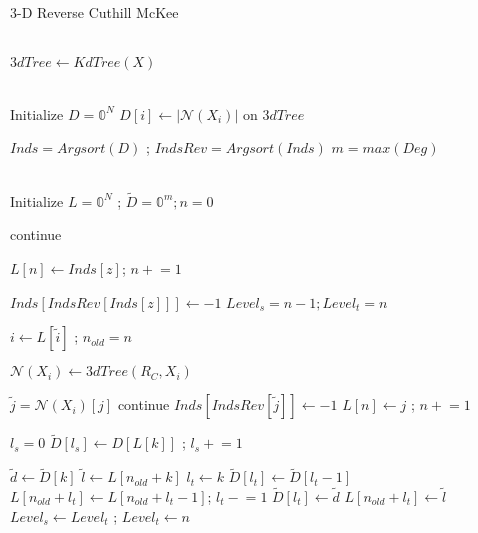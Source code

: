 \documentclass[a4paper]{article}
\begin{document}
\begin{algorithm}
\caption{3-D Reverse Cuthill McKee}\label{alg:3DRCM}
\begin{algorithmic}[1]
\\
\State $3dTree \gets KdTree(X)$ 


\\
\State Initialize $D = \mathbb{0}^{N}$
    \State $D[i] \gets |\mathcal{N}(X_i)|$ on $3dTree$
\EndFor
  
\State $Inds = Argsort(D)$ ; $IndsRev = Argsort(Inds)$ 
\State $m = max(Deg)$


\\
\State Initialize $L = \mathbb{0}^{N}$ ; $\tilde{D} = \mathbb{0}^{m}; n = 0$

    \State continue
    \EndIf

    \State $L[n] \gets Inds[z]$; $n \mathrel{+}= 1$ 

    \State $Inds[IndsRev[Inds[z]]] \gets -1$ 
    \State $Level_{s} = n - 1 ; Level_{t} = n$ 
    
            \State $i \gets L[\tilde{i}]$ ; $n_{old} = n$
 
            \State $\mathcal{N}(X_i) \gets 3dTree(R_C, X_i)$ 

                \State $\tilde{j} = \mathcal{N}(X_i)[j]$
                    \State continue
                \EndIf
                \State $Inds[IndsRev[\tilde{j}]] \gets -1 $ 
                \State $L[n] \gets j$ ; $n \mathrel{+}= 1$
            
            \EndFor
            
            \State $l_s = 0$
                \State $\tilde{D}[l_s] \gets D[L[k]]$ ; $l_s \mathrel{+}= 1$
            \EndFor

                \State $\tilde{d} \gets \tilde{D}[k]$
                \State $\tilde{l} \gets L[n_{old} + k]$
                \State $l_t \gets k$
                    \State $\tilde{D}[l_t] \gets \tilde{D}[l_t - 1]$
                    \State $L[n_{old} +l_t] \gets L[n_{old} + l_t -1]$; $l_t \mathrel{-}= 1$
                \EndWhile
                \State $\tilde{D}[l_t] \gets \tilde{d}$
                \State $L[n_{old} + l_t] \gets \tilde{l} $
            \EndFor
        \EndFor
    \State $Level_s \gets Level_t$ ; $Level_t \gets n$
        

\end{algorithmic}
\end{algorithm}
\end{document}
